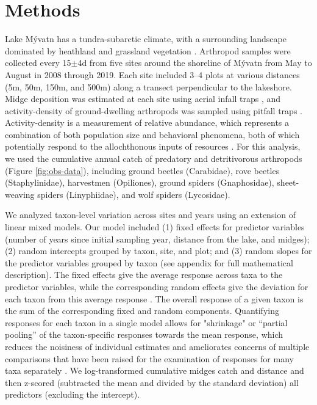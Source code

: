 \section*{Methods}

Lake M\'{y}vatn has a tundra-subarctic climate, with a surrounding landscape
dominated by heathland and grassland vegetation \citep{Einarsson2004}.
Arthropod samples were collected every 15$\pm$4d from five sites around the
shoreline of M\'{y}vatn from May to August in 2008 through 2019.
Each site included 3--4 plots at various distances
(5m, 50m, 150m, and 500m) along a transect perpendicular to the lakeshore.
Midge deposition was estimated at each site using aerial infall traps \citep{Dreyer2015},
and activity-density of ground-dwelling arthropods was sampled using pitfall traps
\citep{Southwood2009}.
Activity-density is a measurement of relative abundance, which represents a combination
of both population size and behavioral phenomena, both of which potentially respond
to the allochthonous inputs of resources \citep{Ostfeld2000}.
For this analysis, we used the cumulative annual catch of predatory and
detritivorous arthropods (Figure \ref{fig:obs-data}),
including ground beetles (Carabidae), rove beetles (Staphylinidae),
harvestmen (Opiliones), ground spiders (Gnaphosidae),
sheet-weaving spiders (Linyphiidae), and wolf spiders (Lycosidae).



We analyzed taxon-level variation across sites and years using an extension of
linear mixed models.
Our model included (1) fixed effects for predictor variables (number of years since initial
sampling year, distance from the lake, and midges);
(2) random intercepts grouped by taxon, site, and plot; and
(3) random slopes for the predictor variables grouped by taxon
(see appendix for full mathematical description).
The fixed effects give the average response across taxa to the predictor variables,
while the corresponding random effects give the deviation for each taxon from this
average response \citep{Jackson2012}.
The overall response of a given taxon is the sum of the corresponding fixed and
random components.
Quantifying responses for each taxon in a single model 
allows for "shrinkage" or “partial pooling” of the taxon-specific responses towards the mean response,
which reduces the noisiness of individual estimates and ameliorates concerns of multiple
comparisons \citep{Gelman2012} that have been raised for the examination of
responses for many taxa separately \citep{Mcgarigal2013}.
We log-transformed cumulative midges catch and distance and then z-scored (subtracted the mean 
and divided by the standard deviation) all predictors
(excluding the intercept).



